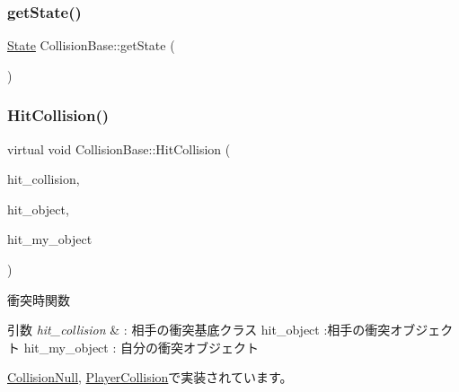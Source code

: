 \subsubsection{\texorpdfstring{get\+State()}{getState()}}
{\footnotesize\ttfamily \mbox{\hyperlink{class_collision_base_a4dd1ed00099a19c0176913af93c4e365}{State}} Collision\+Base\+::get\+State (\begin{DoxyParamCaption}{ }\end{DoxyParamCaption})\hspace{0.3cm}{\ttfamily [inline]}}

\mbox{\label{class_collision_base_a5c94fe03f875595758e83eb2a176e45d}} 
\subsubsection{\texorpdfstring{Hit\+Collision()}{HitCollision()}}
{\footnotesize\ttfamily virtual void Collision\+Base\+::\+Hit\+Collision (\begin{DoxyParamCaption}\item[{\mbox{\hyperlink{class_collision_base}{Collision\+Base}} $\ast$}]{hit\+\_\+collision,  }\item[{\mbox{\hyperlink{class_collision_object}{Collision\+Object}} $\ast$}]{hit\+\_\+object,  }\item[{\mbox{\hyperlink{class_collision_object}{Collision\+Object}} $\ast$}]{hit\+\_\+my\+\_\+object }\end{DoxyParamCaption})\hspace{0.3cm}{\ttfamily [pure virtual]}}



衝突時関数 


\begin{DoxyParams}{引数}
{\em hit\+\_\+collision} & \+: 相手の衝突基底クラス hit\+\_\+object \+:相手の衝突オブジェクト hit\+\_\+my\+\_\+object \+: 自分の衝突オブジェクト \\
\hline
\end{DoxyParams}


\mbox{\hyperlink{class_collision_null_a580f507d8918865679feec3cc7b613d1}{Collision\+Null}}, \mbox{\hyperlink{class_player_collision_ad937a5fd226e742270202bf4eff53767}{Player\+Collision}}で実装されています。

\mbox{\label{class_collision_base_a48c9d1d9e4286cde5054d4d2aa70bdd8}} 
